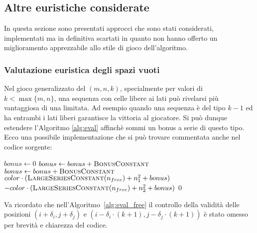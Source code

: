 \documentclass{article}
\begin{document}
\subsection{Altre euristiche considerate}

In questa sezione sono presentati approcci che sono stati considerati,
implementati ma in definitiva scartati in quanto non hanno offerto un
miglioramento apprezzabile allo stile di gioco dell'algoritmo.

\subsubsection{Valutazione euristica degli spazi vuoti}

Nel gioco generalizzato del $(m, n, k)$, specialmente per valori di $k < \max\{m,n\}$,
una sequenza con celle libere ai lati pu\`o rivelarsi pi\`u vantaggiosa di una
limitata. Ad esempio quando una sequenza \`e del tipo $k-1$ ed ha entrambi i lati liberi
garantisce la vittoria al giocatore. Si pu\`o dunque estendere l'Algoritmo
\vref{alg:eval} affinch\`e sommi un bonus a serie di questo tipo.
Ecco una possibile implementazione che si pu\`o trovare
commentata anche nel codice sorgente:

\begin{algorithm}[H]
  \caption{Valutazione delle serie favorendo spazi liberi adiacenti}
  \label{alg:eval_free}
  \begin{algorithmic}[0]
    \State $bonus \gets 0$
      \State $bonus \gets bonus + \textsc{BonusConstant}$
    \EndIf
      \State $bonus \gets bonus + \textsc{BonusConstant}$
    \EndIf
    \Statex
      \State \Return $color \cdot (\Call{LargeSeriesConstant}{n_{free}} + n_1^2 + bonus)$
    \State \Return $-color \cdot (\Call{LargeSeriesConstant}{n_{free}} + n_2^2 + bonus)$
    \Else
      \State \Return $0$
    \EndIf
    \EndProcedure
  \end{algorithmic}
\end{algorithm}

Va ricordato che nell'Algoritmo~\ref{alg:eval_free} il controllo della validit\`a delle
posizioni $(i + \delta_i, j + \delta_j)$ e $(i - \delta_i \cdot (k+1), j - \delta_j \cdot (k+1))$
\`e stato omesso per brevit\`a e chiarezza del codice.
\end{document}
